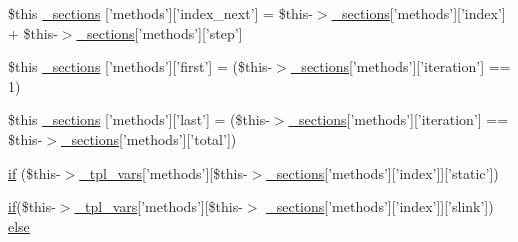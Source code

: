 \begin{DoxyCompactItemize}
\item 
\$this \hyperlink{34d6fa4bfd5eef6424a9ddc74a166350_2_06_06-14_05_06_06-1407541581_05method_8tpl_8php_aa0b0a61e1ce2da827851058d73f8d4d5}{\-\_\-sections} \mbox{[}'methods'\mbox{]}\mbox{[}'index\-\_\-next'\mbox{]} = \$this-\/$>$\hyperlink{_06_06127_05_06_0612781687_05pkgelementindex_8tpl_8php_a9e3d26b39edfe29c3f29b8035ef33828}{\-\_\-sections}\mbox{[}'methods'\mbox{]}\mbox{[}'index'\mbox{]} + \$this-\/$>$\hyperlink{_06_06127_05_06_0612781687_05pkgelementindex_8tpl_8php_a9e3d26b39edfe29c3f29b8035ef33828}{\-\_\-sections}\mbox{[}'methods'\mbox{]}\mbox{[}'step'\mbox{]}
\item 
\$this \hyperlink{34d6fa4bfd5eef6424a9ddc74a166350_2_06_06-14_05_06_06-1407541581_05method_8tpl_8php_a7d58b91b15dcc02d1625f3f5800469e3}{\-\_\-sections} \mbox{[}'methods'\mbox{]}\mbox{[}'first'\mbox{]} = (\$this-\/$>$\hyperlink{_06_06127_05_06_0612781687_05pkgelementindex_8tpl_8php_a9e3d26b39edfe29c3f29b8035ef33828}{\-\_\-sections}\mbox{[}'methods'\mbox{]}\mbox{[}'iteration'\mbox{]} == 1)
\item 
\$this \hyperlink{34d6fa4bfd5eef6424a9ddc74a166350_2_06_06-14_05_06_06-1407541581_05method_8tpl_8php_a26ad642c8bc6c5186b216a3400fd805a}{\-\_\-sections} \mbox{[}'methods'\mbox{]}\mbox{[}'last'\mbox{]} = (\$this-\/$>$\hyperlink{_06_06127_05_06_0612781687_05pkgelementindex_8tpl_8php_a9e3d26b39edfe29c3f29b8035ef33828}{\-\_\-sections}\mbox{[}'methods'\mbox{]}\mbox{[}'iteration'\mbox{]} == \$this-\/$>$\hyperlink{_06_06127_05_06_0612781687_05pkgelementindex_8tpl_8php_a9e3d26b39edfe29c3f29b8035ef33828}{\-\_\-sections}\mbox{[}'methods'\mbox{]}\mbox{[}'total'\mbox{]})
\item 
\hyperlink{34d6fa4bfd5eef6424a9ddc74a166350_2_06_06-14_05_06_06-1407541581_05method_8tpl_8php_aaf683b5c5a2498e0fab360717e5735db}{if} (\$this-\/$>$\hyperlink{_06_06127_05_06_0612781687_05pkgelementindex_8tpl_8php_a4a4846d8e68d455590131a05697f67a3}{\-\_\-tpl\-\_\-vars}\mbox{[}'methods'\mbox{]}\mbox{[}\$this-\/$>$\hyperlink{_06_06127_05_06_0612781687_05pkgelementindex_8tpl_8php_a9e3d26b39edfe29c3f29b8035ef33828}{\-\_\-sections}\mbox{[}'methods'\mbox{]}\mbox{[}'index'\mbox{]}\mbox{]}\mbox{[}'static'\mbox{]})
\item 
\hyperlink{_setup_8inc_8php_ad0184337b31d13763ec8751feff4aabe}{if}(\$this-\/$>$\hyperlink{_06_06127_05_06_0612781687_05pkgelementindex_8tpl_8php_a4a4846d8e68d455590131a05697f67a3}{\-\_\-tpl\-\_\-vars}\mbox{[}'methods'\mbox{]}\mbox{[}\$this-\/$>$\*
\hyperlink{_06_06127_05_06_0612781687_05pkgelementindex_8tpl_8php_a9e3d26b39edfe29c3f29b8035ef33828}{\-\_\-sections}\mbox{[}'methods'\mbox{]}\mbox{[}'index'\mbox{]}\mbox{]}\mbox{[}'slink'\mbox{]}) \hyperlink{34d6fa4bfd5eef6424a9ddc74a166350_2_06_06-14_05_06_06-1407541581_05method_8tpl_8php_a01eba324ebcd5b1ae540bb43095787f5}{else}

\end{DoxyCompactItemize}
